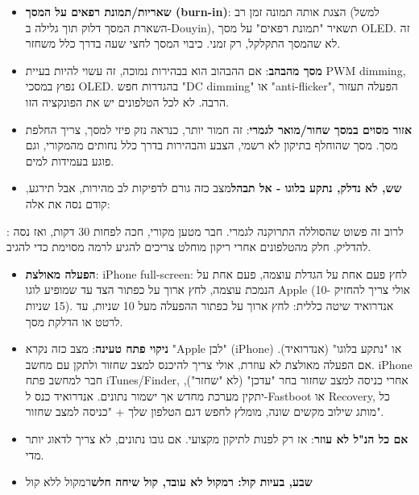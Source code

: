 \begin{itemize}
  \item \textbf{שאריות/תמונת רפאים על המסך (burn-in)}: הצגת אותה תמונה זמן רב (למשל השארת המסך דלוק תוך גלילה ב-Douyin), תשאיר "תמונת רפאים" על מסך OLED. זה לא שהמסך התקלקל, רק זמני. כיבוי המסך לחצי שעה בדרך כלל משחזר.
  \item \textbf{מסך מהבהב}: אם ההבהוב הוא בבהירות נמוכה, זה עשוי להיות בעיית PWM dimming, נפוץ במסכי OLED. בהגדרות חפש "DC dimming" או "anti-flicker", הפעלה תעזור הרבה. לא לכל הטלפונים יש את הפונקציה הזו.
  \item \textbf{אזור מסוים במסך שחור/מואר לגמרי}: זה חמור יותר, כנראה נזק פיזי למסך, צריך החלפת מסך. מסך שהוחלף בתיקון לא רשמי, הצבע והבהירות בדרך כלל נחותים מהמקורי, וגם פוגע בעמידות למים.
  \item \textbf{שש, לא נדלק, נתקע בלוגו - אל תבהל}מצב כזה גורם לדפיקות לב מהירות, אבל תירגע, קודם נסה את אלה:
\end{itemize}


: לרוב זה פשוט שהסוללה התרוקנה לגמרי. חבר מטען מקורי, חכה לפחות 30 דקות, ואז נסה להדליק. חלק מהטלפונים אחרי ריקון מוחלט צריכים להגיע לרמה מסוימת כדי להגיב.

\begin{itemize}
  \item \textbf{הפעלה מאולצת}: iPhone full-screen: לחץ פעם אחת על הגדלת עוצמה, פעם אחת על הנמכת עוצמה, לחץ ארוך על כפתור הצד עד שמופיע לוגו Apple (אולי צריך להחזיק 10-15 שניות). אנדרואיד שיטה כללית: לחץ ארוך על כפתור ההפעלה מעל 10 שניות, עד לרטט או הדלקת מסך.
  \item \textbf{ניקוי פתח טעינה}: מצב כזה נקרא "Apple לבן" (iPhone) או "נתקע בלוגו" (אנדרואיד). אם הפעלה מאולצת לא עוזרת, אולי צריך להיכנס למצב שחזור ולתקן עם מחשב. iPhone חבר למחשב פתח iTunes/Finder, אחרי כניסה למצב שחזור בחר "עדכן" (לא "שחזר"), יתקין מערכת מחדש אך ישמור נתונים. אנדרואיד כנס ל-Fastboot או Recovery, כל מותג שילוב מקשים שונה, מומלץ לחפש דגם הטלפון שלך + "כניסה למצב שחזור".
  \item \textbf{אם כל הנ"ל לא עוזר}: אז רק לפנות לתיקון מקצועי. אם גובו נתונים, לא צריך לדאוג יותר מדי.
  \item \textbf{שבע, בעיות קול: רמקול לא עובד, קול שיחה חלש}רמקול ללא קול
\end{itemize}


